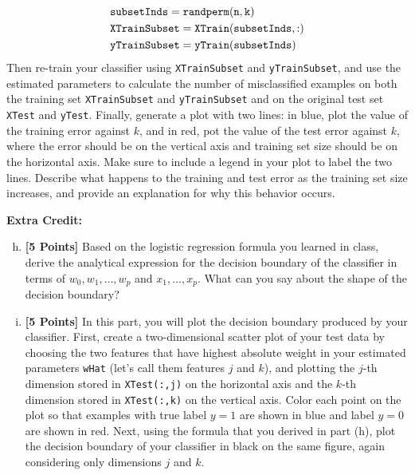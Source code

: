 \documentclass{article}
\newcommand \code [1]{{\tt #1}}
\begin{document}
\begin{enumerate}[(a)]
\begin{align*}
&\code{subsetInds = randperm(n,k)} \\
&\code{XTrainSubset = XTrain(subsetInds,:)} \\
&\code{yTrainSubset = yTrain(subsetInds)}
\end{align*}
Then re-train your classifier using \code{XTrainSubset} and \code{yTrainSubset}, and use the estimated parameters to calculate the number of misclassified examples on both the training set \code{XTrainSubset} and \code{yTrainSubset} and on the original test set \code{XTest} and \code{yTest}. Finally, generate a plot with two lines: in blue, plot the value of the training error against $k$, and in red, pot the value of the test error against $k$, where the error should be on the vertical axis and training set size should be on the horizontal axis. Make sure to include a legend in your plot to label the two lines. Describe what happens to the training and test error as the training set size increases, and provide an explanation for why this behavior occurs.
\end{enumerate}
{\bf Extra Credit:}
\begin{enumerate}[(a)]
\setcounter{enumi}{7}
\item {\bf [5 Points]}  Based on the logistic regression formula you learned in class, derive the analytical expression for the decision boundary of the classifier in terms of $w_0, w_1, \ldots, w_p$ and $x_1, \ldots, x_p$. What can you say about the shape of the decision boundary? 
\item {\bf [5 Points]} In this part, you will plot the decision boundary produced by your classifier. First, create a two-dimensional scatter plot of your test data by choosing the two features that have highest absolute weight in your estimated parameters \code{wHat} (let's call them features $j$ and $k$), and plotting the $j$-th dimension stored in \code{XTest(:,j)} on the horizontal axis and the  $k$-th dimension stored in \code{XTest(:,k)} on the vertical axis. Color each point on the plot so that examples with true label $y = 1$ are shown in blue and label $y = 0$ are shown in red. Next, using the formula that you derived in part (h), plot the decision boundary of your classifier in black on the same figure, again considering only dimensions $j$ and $k$. 
\end{enumerate}
\end{document}
